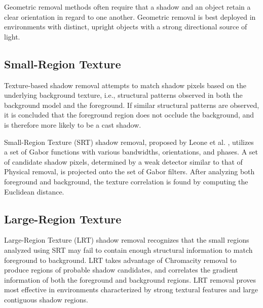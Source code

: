 Geometric removal methods often require that a shadow and an object retain a clear orientation in regard to one another. Geometric removal is best deployed in environments with distinct, upright objects with a strong directional source of light.  

\subsection{Small-Region Texture}

Texture-based shadow removal attempts to match shadow pixels based on the underlying background texture, i.e., structural patterns observed in both the background model and the foreground. If similar structural patterns are observed, it is concluded that the foreground region does not occlude the background, and is therefore more likely to be a cast shadow.

Small-Region Texture (SRT) shadow removal, proposed by Leone et al. \cite{leone2007shadow}, utilizes a set of Gabor functions with various bandwidths, orientations, and phases. A set of candidate shadow pixels, determined by a weak detector similar to that of Physical removal, is projected onto the set of Gabor filters. After analyzing both foreground and background, the texture correlation is found by computing the Euclidean distance.

\subsection{Large-Region Texture}

Large-Region Texture (LRT) shadow removal recognizes that the small regions analyzed using SRT may fail to contain enough structural information to match foreground to background. LRT takes advantage of Chromacity removal to produce regions of probable shadow candidates, and correlates the gradient information of both the foreground and background regions. LRT removal proves most effective in environments characterized by strong textural features and large contiguous shadow regions.


